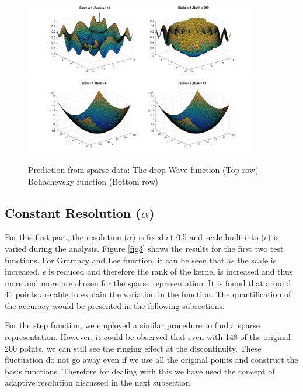 \documentclass[procedia]{easychair}
\begin{document}
\begin{figure}[]  %
	\centering
	\includegraphics[width=4in]{fig_wave.jpg}
	\includegraphics[width=4in]{fig_boha.jpg}
	\caption[Optional caption]{Prediction from sparse data: The drop Wave function (Top row) Bohachevsky function (Bottom row)}
	\label{fig4} %
\end{figure}





\subsection{Constant Resolution ($\alpha$)}

For this first part, the resolution ($\alpha$) is fixed at 0.5 and scale built into ($\epsilon$) is varied during the analysis. Figure \ref{fig3} shows the results for the first two test functions. For Gramacy and Lee function, it can be seen that as the scale is increased, $\epsilon$ is reduced and therefore the rank of the kernel is increased and thus more and more are chosen for the sparse representation. It is found that around 41 points are able to explain the variation in the function. The quantification of the accuracy would be presented in the following subsections. 

For the step function, we employed a similar procedure to find a sparse representation. However, it could be observed that even with 148 of the original 200 points, we can still see the ringing effect at the discontinuity. These fluctuation do not go away even if we use all the original points and construct the basis functions. Therefore for dealing with this we have used the concept of adaptive resolution discussed in the next subsection.
\end{document}
